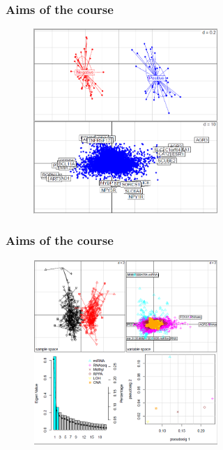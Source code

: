 \documentclass[10pt,xcolor=dvipsnames]{beamer}\usepackage[]{graphicx}\usepackage[]{color}
\begin{document}
\begin{frame}\frametitle{Aims of the course}

\begin{figure}
\begin{center}
 \includegraphics[height=7cm, width=7cm]{figures/step2.png}
\end{center}
\end{figure}

\end{frame}

\begin{frame}\frametitle{Aims of the course}

\begin{figure}
\begin{center}
 \includegraphics[height=7cm, width=7cm]{figures/step3.png}
\end{center}
\end{figure}

\end{frame}
\end{document}

